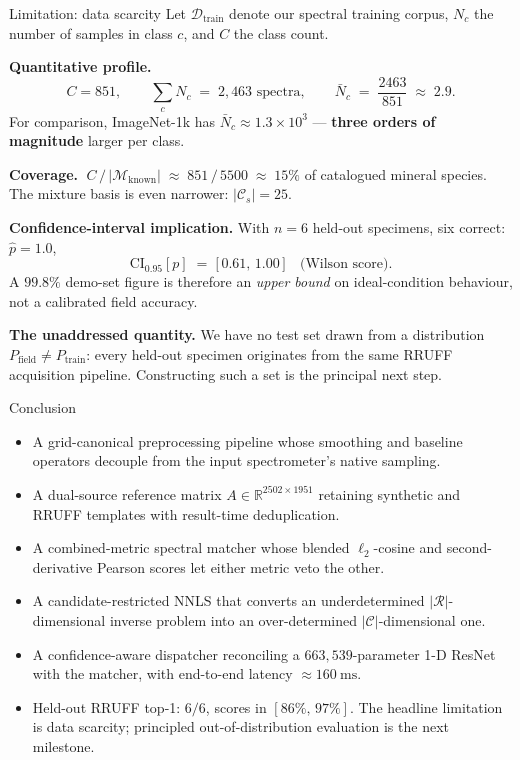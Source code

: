\documentclass[10pt,aspectratio=169]{beamer}
\newcommand{\bad}[1]{\textcolor{bad}{\textbf{#1}}}
\newcommand{\R}{\mathbb{R}}
\begin{document}
\begin{frame}{Limitation: data scarcity}
Let $\mathcal{D}_{\text{train}}$ denote our spectral training corpus,
$N_{c}$ the number of samples in class $c$, and $C$ the class count.
\smallskip

\textbf{Quantitative profile.}
\[
  C = 851,\qquad
  \sum_{c} N_{c} \;=\; 2{,}463 \text{ spectra},\qquad
  \bar{N}_{c} \;=\; \frac{2463}{851} \;\approx\; 2.9.
\]
For comparison, ImageNet-1k has $\bar{N}_{c} \approx 1.3 \times 10^{3}$ ---
\bad{three orders of magnitude} larger per class.
\smallskip

\textbf{Coverage.}
$\;C \,/\, |\mathcal{M}_{\text{known}}|
   \;\approx\; 851 \,/\, 5500 \;\approx\; 15\%$
of catalogued mineral species.
The mixture basis is even narrower: $|\mathcal{C}_{\!s}| = 25$.
\smallskip

\textbf{Confidence-interval implication.}
With $n = 6$ held-out specimens, six correct: $\hat{p} = 1.0$,
\[
  \mathrm{CI}_{0.95}\!\left[p\right]
  \;=\; \bigl[\,0.61,\, 1.00\,\bigr]
  \quad \text{(Wilson score).}
\]
A $99.8\%$ demo-set figure is therefore an \emph{upper bound} on
ideal-condition behaviour, not a calibrated field accuracy.
\smallskip

\textbf{The unaddressed quantity.}
We have no test set drawn from a distribution
$P_{\text{field}} \neq P_{\text{train}}$: every held-out specimen
originates from the same RRUFF acquisition pipeline. \alert{Constructing
such a set is the principal next step.}
\end{frame}

\begin{frame}{Conclusion}
\begin{itemize}\setlength\itemsep{0.30em}
  \item A grid-canonical preprocessing pipeline whose smoothing and baseline
        operators decouple from the input spectrometer's native sampling.
  \item A dual-source reference matrix
        $A \in \R^{2502 \times 1951}$ retaining synthetic and RRUFF
        templates with result-time deduplication.
  \item A combined-metric spectral matcher whose blended $\ell_{2}$-cosine
        and second-derivative Pearson scores let either metric veto the
        other.
  \item A candidate-restricted NNLS that converts an underdetermined
        $|\mathcal{R}|$-dimensional inverse problem into an
        over-determined $|\mathcal{C}|$-dimensional one.
  \item A confidence-aware dispatcher reconciling a $663{,}539$-parameter
        1-D ResNet with the matcher, with end-to-end latency
        $\approx \SI{160}{\milli\second}$.
  \item Held-out RRUFF top-1: $6/6$, scores in $[86\%,\,97\%]$.
        The headline limitation is data scarcity; principled
        out-of-distribution evaluation is the next milestone.
\end{itemize}
\end{frame}
\end{document}
